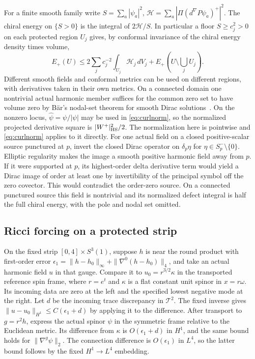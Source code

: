 \documentclass[11pt]{article}
\theoremstyle{remark}
\begin{document}
For a finite smooth family write \(S=\sum_a|\psi_a|^2\), \(\mathcal H=\sum_a|\Pi(d^\nabla P\psi_a)^+|^2\). The chiral energy on \(\{S>0\}\) is the integral of \(2\mathcal H/S\). In particular a floor \(S\ge c_j^2>0\) on each protected region \(U_j\) gives, by conformal invariance of the chiral energy density times volume,
\begin{equation}
 E_+(U)\le 2\sum_j c_j^{-2}\int_{U_j}\mathcal H_j\,dV_j
           +E_+(U\setminus\textstyle\bigcup_j U_j).
 \label{eq:floorcov}
\end{equation}
Different smooth fields and conformal metrics can be used on different regions, with derivatives taken in their own metrics. On a connected domain one nontrivial actual harmonic member suffices for the common zero set to have volume zero by B\"ar's nodal-set theorem for smooth Dirac solutions~\cite[Main Theorem]{Baer1997Nodal}. On the nonzero locus, \(\widehat\psi=\psi/|\psi|\) may be used in \eqref{eq:curlnorm}, so the normalized projected derivative square is \(|W^+|_{\rm HS}^2/2\). The normalization here is pointwise and \eqref{eq:curlnorm} applies to it directly. For one actual field on a closed positive-scalar source punctured at \(p\), invert the closed Dirac operator on \(\delta_p\eta\) for \(\eta\in S^-_p\setminus\{0\}\). Elliptic regularity makes the image a smooth positive harmonic field away from \(p\). If it were supported at \(p\), its highest-order delta derivative term would yield a Dirac image of order at least one by invertibility of the principal symbol off the zero covector. This would contradict the order-zero source. On a connected punctured source this field is nontrivial and its normalized defect integral is half the full chiral energy, with the pole and nodal set omitted.

\subsection{Ricci forcing on a protected strip}
On the fixed strip \([0,4]\times S^3(1)\), suppose \(h\) is near the round product with first-order error \(\epsilon_1=\|h-h_0\|_\infty+\|\nabla^0(h-h_0)\|_4\), and take an actual harmonic field \(u\) in that gauge. Compare it to \(u_0=r^{3/2}\kappa\) in the transported reference spin frame, where \(r=e^t\) and \(\kappa\) is a flat constant unit spinor in \(x=r\omega\). Its incoming data are zero at the left and the specified lowest negative mode at the right. Let \(d\) be the incoming trace discrepancy in \(\mathcal T^2\). The fixed inverse gives \(\|u-u_0\|_{H^1}\le C(\epsilon_1+d)\) by applying it to the difference. After transport to \(g=r^2h\), express the actual spinor \(\psi\) in the symmetric frame relative to the Euclidean metric. Its difference from \(\kappa\) is \(O(\epsilon_1+d)\) in \(H^1\), and the same bound holds for \(\|\nabla^g\psi\|_2\). The connection difference is \(O(\epsilon_1)\) in \(L^4\), so the latter bound follows by the fixed \(H^1\to L^4\) embedding.
\end{document}
